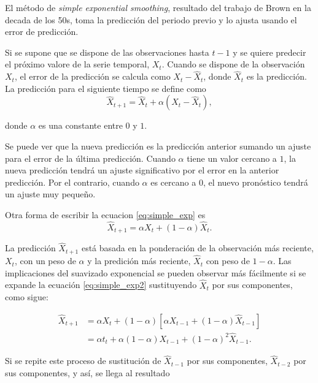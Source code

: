 \documentclass[12pt,twoside]{article}
\begin{document}
El método de \textit{simple exponential smoothing}, resultado del trabajo de Brown en la decada de los 50s, toma la predicción del periodo previo y lo ajusta usando el error de predicción.

Si se supone que se dispone de las observaciones hasta $t-1$ y se quiere predecir el próximo valore de la serie temporal, $X_t$. Cuando se dispone de la observación $X_t$, el error de la predicción se calcula como $X_t - \hat{X}_t$, donde $\hat{X}_t$ es la predicción. La predicción para el siguiente tiempo se define como
\begin{equation} \label{eq:simple_exp}
   \hat{X}_{t+1} = \hat{X}_t + \alpha (X_t - \hat{X}_t), 
\end{equation}

donde $\alpha$ es una constante entre $0$ y $1$.

Se puede ver que la nueva predicción es la predicción anterior sumando un ajuste para el error de la última predicción. Cuando $\alpha$ tiene un valor cercano a $1$, la nueva predicción tendrá un ajuste significativo por el error en la anterior predicción. Por el contrario, cuando $\alpha$ es cercano a $0$, el nuevo pronóstico tendrá un ajuste muy pequeño.

Otra forma de escribir la ecuacion \eqref{eq:simple_exp} es
\begin{equation} \label{eq:simple_exp2}
    \hat{X}_{t+1} = \alpha X_t + (1-\alpha)\hat{X}_t. 
\end{equation}

La predicción $\hat{X}_{t+1}$ está basada en la ponderación de la observación más reciente, $X_t$, con un peso de $\alpha$ y la predición más reciente, $\hat{X}_t$ con peso de $1-\alpha$. Las implicaciones del suavizado exponencial se pueden observar más fácilmente si se expande la ecuación \eqref{eq:simple_exp2} sustituyendo $\hat{X}_t$ por sus componentes, como sigue:


\begin{equation*}
\begin{split}
\hat{X}_{t+1} & =  \alpha X_t + (1-\alpha) [\alpha X_{t-1} + (1-\alpha)\hat{X}_{t-1}] \\
& = \alpha t_t + \alpha(1-\alpha)X_{t-1} + (1-\alpha)^2\hat{X}_{t-1}.
\end{split}
\end{equation*}

Si se repite este proceso de sustitución de $\hat{X}_{t-1}$ por sus componentes, $\hat{X}_{t-2}$ por sus componentes, y así, se llega al resultado
\end{document}

